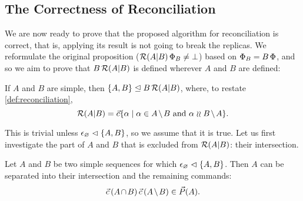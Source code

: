 
\subsection{The Correctness of Reconciliation}

We are now ready to prove that the proposed algorithm for reconciliation is correct,
that is, applying its result is not going to break the replicas.
We reformulate the original proposition ($\mathcal{R}({A}|{B})\,\Phi_B\neq\bot$)
based on $\Phi_B=B\,\Phi$, and so we aim to prove that
$B\,\mathcal{R}({A}|{B})$ is defined wherever $A$ and $B$ are defined:

\begin{myth}
If $A$ and $B$ are simple, then ${\{{A,B}\}}\trianglelefteq{B\,\mathcal{R}({A}|{B})}$,
where, to restate \cref{def:reconciliation},
\[ \reca = \ords{\alpha \whr \alpha\in \ambnp  \mbox{~and~}  \alpha\indep \bmanp }. \]
\end{myth}

This is trivial unless ${\epsilon_\varnothing}\vartriangleleft{\{{A,B}\}}$, so we assume that it is true.
Let us first investigate the part of $A$ and $B$ that is excluded from
$\mathcal{R}({A}|{B})$: their intersection.

\begin{mylem}
Let $A$ and $B$ be two simple sequences for which ${\epsilon_\varnothing}\vartriangleleft{\{{A, B}\}}$.
Then $A$ can be separated into their intersection and the remaining commands:
\[ \acb\cc\amb \in \orderset{A}. \]
\end{mylem}


